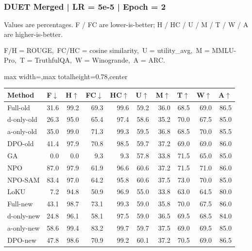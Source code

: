 \documentclass[aspectratio=169,11pt]{beamer}
\begin{document}
\begin{frame}[t]
\frametitle{DUET Merged | LR = 5e-5 | Epoch = 2}
{\tiny Values are percentages. F / FC are lower-is-better; H / HC / U / M / T / W / A are higher-is-better.}

{\tiny F/H = ROUGE,\ FC/HC = cosine similarity,\ U = utility\_avg,\ M = MMLU-Pro,\ T = TruthfulQA,\ W = Winogrande,\ A = ARC.}

\vspace{0.35em}
\centering
\scriptsize
\setlength{\tabcolsep}{3.6pt}
\renewcommand{\arraystretch}{1.05}
\begin{adjustbox}{max width=\textwidth,max totalheight=0.78\textheight,center}
\begin{tabular}{l*{9}{r}}
\toprule
Method & F$\downarrow$ & H$\uparrow$ & FC$\downarrow$ & HC$\uparrow$ & U$\uparrow$ & M$\uparrow$ & T$\uparrow$ & W$\uparrow$ & A$\uparrow$ \\
\midrule
\rowcolor{blue!10}
Full-old & 31.6 & 99.2 & 69.3 & 99.6 & 59.2 & 36.0 & 68.5 & 69.0 & 86.5 \\
\rowcolor{orange!10}
d-only-old & 26.3 & 95.0 & 65.4 & 97.4 & 58.6 & 35.2 & 70.0 & 67.5 & 85.0 \\
\rowcolor{green!10}
a-only-old & 35.0 & 99.0 & 71.3 & 99.3 & 59.5 & 36.8 & 68.5 & 70.0 & 85.5 \\
\rowcolor{gray!8}
DPO-old & 41.4 & 97.9 & 70.8 & 98.5 & 59.7 & 37.2 & 69.0 & 69.0 & 86.0 \\
\rowcolor{gray!8}
GA & 0.0 & 0.0 & 9.3 & 9.3 & 57.8 & 33.8 & 71.5 & 65.0 & 85.0 \\
\rowcolor{gray!8}
NPO & 87.0 & 97.9 & 61.9 & 96.6 & 60.6 & 37.2 & 71.5 & 71.0 & 86.0 \\
\rowcolor{gray!8}
NPO-SAM & 83.4 & 97.0 & 64.2 & 95.8 & 60.6 & 37.5 & 73.0 & 70.0 & 85.0 \\
\rowcolor{gray!8}
LoKU & 7.2 & 94.8 & 50.9 & 96.9 & 55.0 & 33.8 & 63.0 & 64.5 & 80.0 \\
\rowcolor{blue!20}
Full-new & 43.1 & 98.7 & 73.1 & 99.3 & 59.0 & 35.8 & 70.0 & 67.5 & 86.0 \\
\rowcolor{orange!20}
d-only-new & 24.8 & 96.1 & 58.1 & 97.5 & 59.0 & 36.5 & 69.5 & 68.5 & 84.0 \\
\rowcolor{green!20}
a-only-new & 58.6 & 99.4 & 83.2 & 99.7 & 59.7 & 37.5 & 69.0 & 69.5 & 85.0 \\
\rowcolor{gray!15}
DPO-new & 47.8 & 98.6 & 70.9 & 99.2 & 60.1 & 37.2 & 70.5 & 69.0 & 86.5 \\
\bottomrule
\end{tabular}
\end{adjustbox}
\end{frame}
\end{document}
